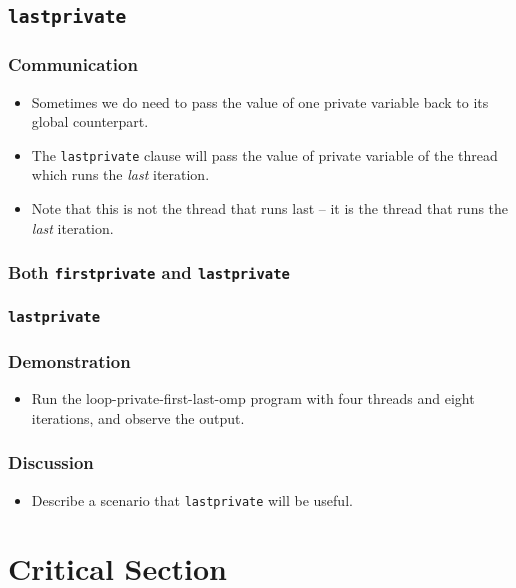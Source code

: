 \documentclass{beamer}
\begin{document}
\subsection{\tt lastprivate}


\begin{frame}
\frametitle{Communication}
\begin{itemize}
\item Sometimes we do need to pass the value of one private variable
  back to its global counterpart.
\item The {\tt lastprivate} clause will pass the value of private
  variable of the thread which runs the {\em last} iteration.
\item Note that this is not the thread that runs last -- it is the
  thread that runs the {\em last} iteration.
\end{itemize}
\end{frame}

\begin{frame}
\frametitle{Both {\tt firstprivate} and {\tt lastprivate}}
\centerline{}
\end{frame}

\begin{frame}
\frametitle{\tt lastprivate} 
\end{frame}


\begin{frame}
\frametitle{Demonstration}
\begin{itemize}
\item Run the loop-private-first-last-omp program with four threads
  and eight iterations, and observe the output.
\end{itemize}
\end{frame}

\begin{frame}
\frametitle{Discussion}
\begin{itemize}
\item Describe a scenario that {\tt lastprivate} will be useful.
\end{itemize}
\end{frame}

\section{Critical Section}
\end{document}
